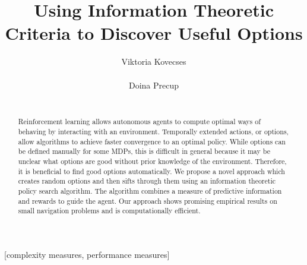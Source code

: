 \documentclass{acm_proc_article-sp}
\begin{document}
\title{Using Information Theoretic Criteria to Discover Useful Options}


%
\author{
%
%
\alignauthor
Viktoria Kovecses\\
       \\
\alignauthor
Doina Precup\\
       \\
}

\maketitle
\begin{abstract}

	Reinforcement learning allows autonomous agents to compute optimal ways of behaving by interacting with an environment. Temporally extended actions, or options, allow algorithms to achieve faster convergence to an optimal policy. While options can be defined manually for some MDPs, this is difficult in general because it may be unclear what options are good without prior knowledge of the environment. Therefore, it is beneficial to find good options automatically. We propose a novel approach which creates random options and then sifts through them using an information theoretic policy search algorithm. The algorithm combines a measure of predictive information and rewards to guide the agent. Our approach shows promising empirical results on small navigation problems and is computationally efficient. 
	
\end{abstract}

[complexity measures, performance measures]
\end{document}
